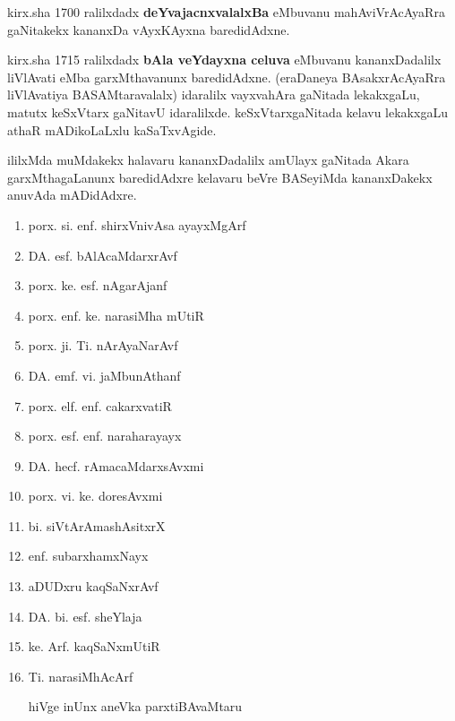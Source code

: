 kirx.sha {\rm 1700} ralilxdadx \textbf{deYvajacnxvalalxBa} eMbuvanu mahAviVrAcAyaRra gaNitakekx kananxDa vAyxKAyxna baredidAdxne.

kirx.sha {\rm 1715} ralilxdadx \textbf{bAla veYdayxna celuva} eMbuvanu kananxDadalilx liVlAvati eMba garxMthavanunx baredidAdxne. (eraDaneya BAsakxrAcAyaRra liVlAvatiya BASAMtaravalalx) idaralilx vayxvahAra gaNitada lekakxgaLu, matutx keSxVtarx gaNitavU idaralilxde. keSxVtarxgaNitada kelavu lekakxgaLu athaR mADikoLaLxlu kaSaTxvAgide.

ililxMda muMdakekx halavaru kananxDadalilx amUlayx gaNitada Akara garxMthagaLanunx baredidAdxre kelavaru beVre BASeyiMda kananxDakekx anuvAda mADidAdxre.

\begin{enumerate}[\rm 1)]
\item porx. si. enf. shirxVnivAsa ayayxMgArf

\item DA. esf. bAlAcaMdarxrAvf

\item porx. ke. esf. nAgarAjanf

\item porx. enf. ke. narasiMha mUtiR

\item porx. ji. Ti. nArAyaNarAvf

\item DA. emf. vi. jaMbunAthanf

\item porx. elf. enf. cakarxvatiR

\item porx. esf. enf. naraharayayx

\item DA. hecf. rAmacaMdarxsAvxmi

\item porx. vi. ke. doresAvxmi

\item bi. siVtArAmashAsitxrX

\item enf. subarxhamxNayx

\item aDUDxru kaqSaNxrAvf

\item DA. bi. esf. sheYlaja

\item ke. Arf. kaqSaNxmUtiR

\item Ti. narasiMhAcArf

hiVge inUnx aneVka parxtiBAvaMtaru
\end{enumerate}

